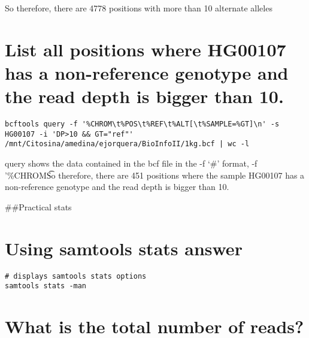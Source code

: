 \documentclass[
]{article}
\begin{document}
So therefore, there are 4778 positions with more than 10 alternate
alleles

\hypertarget{list-all-positions-where-hg00107-has-a-non-reference-genotype-and-the-read-depth-is-bigger-than-10.}{%
\section{List all positions where HG00107 has a non-reference genotype
and the read depth is bigger than
10.}\label{list-all-positions-where-hg00107-has-a-non-reference-genotype-and-the-read-depth-is-bigger-than-10.}}

\begin{verbatim}
bcftools query -f '%CHROM\t%POS\t%REF\t%ALT[\t%SAMPLE=%GT]\n' -s HG00107 -i 'DP>10 && GT="ref"' /mnt/Citosina/amedina/ejorquera/BioInfoII/1kg.bcf | wc -l
\end{verbatim}

query shows the data contained in the bcf file in the -f `\#' format, -f
'\%CHROM\t%

So therefore, there are 451 positions where the sample HG00107 has a
non-reference genotype and the read depth is bigger than 10.

\#\#Practical stats

\hypertarget{using-samtools-stats-answer}{%
\section{Using samtools stats
answer}\label{using-samtools-stats-answer}}

\begin{verbatim}
# displays samtools stats options
samtools stats -man
\end{verbatim}

\hypertarget{what-is-the-total-number-of-reads}{%
\section{What is the total number of
reads?}\label{what-is-the-total-number-of-reads}}
\end{document}
